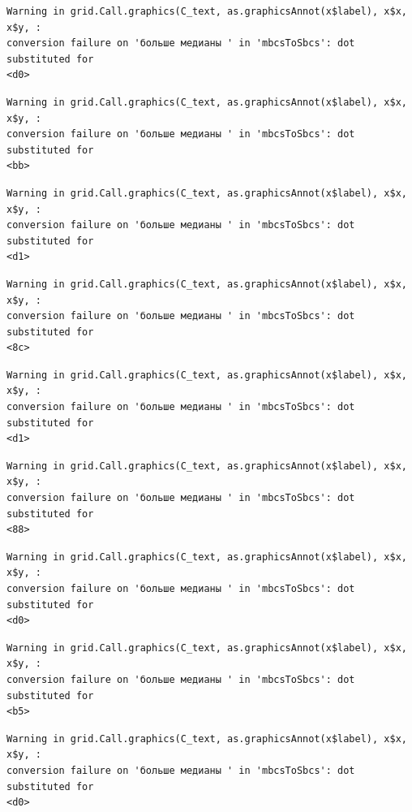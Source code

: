 \documentclass[
  letterpaper,
  DIV=11,
  numbers=noendperiod]{scrreprt}
\theoremstyle{definition}
\theoremstyle{remark}
\begin{document}
\begin{verbatim}
Warning in grid.Call.graphics(C_text, as.graphicsAnnot(x$label), x$x, x$y, :
conversion failure on 'больше медианы ' in 'mbcsToSbcs': dot substituted for
<d0>
\end{verbatim}

\begin{verbatim}
Warning in grid.Call.graphics(C_text, as.graphicsAnnot(x$label), x$x, x$y, :
conversion failure on 'больше медианы ' in 'mbcsToSbcs': dot substituted for
<bb>
\end{verbatim}

\begin{verbatim}
Warning in grid.Call.graphics(C_text, as.graphicsAnnot(x$label), x$x, x$y, :
conversion failure on 'больше медианы ' in 'mbcsToSbcs': dot substituted for
<d1>
\end{verbatim}

\begin{verbatim}
Warning in grid.Call.graphics(C_text, as.graphicsAnnot(x$label), x$x, x$y, :
conversion failure on 'больше медианы ' in 'mbcsToSbcs': dot substituted for
<8c>
\end{verbatim}

\begin{verbatim}
Warning in grid.Call.graphics(C_text, as.graphicsAnnot(x$label), x$x, x$y, :
conversion failure on 'больше медианы ' in 'mbcsToSbcs': dot substituted for
<d1>
\end{verbatim}

\begin{verbatim}
Warning in grid.Call.graphics(C_text, as.graphicsAnnot(x$label), x$x, x$y, :
conversion failure on 'больше медианы ' in 'mbcsToSbcs': dot substituted for
<88>
\end{verbatim}

\begin{verbatim}
Warning in grid.Call.graphics(C_text, as.graphicsAnnot(x$label), x$x, x$y, :
conversion failure on 'больше медианы ' in 'mbcsToSbcs': dot substituted for
<d0>
\end{verbatim}

\begin{verbatim}
Warning in grid.Call.graphics(C_text, as.graphicsAnnot(x$label), x$x, x$y, :
conversion failure on 'больше медианы ' in 'mbcsToSbcs': dot substituted for
<b5>
\end{verbatim}

\begin{verbatim}
Warning in grid.Call.graphics(C_text, as.graphicsAnnot(x$label), x$x, x$y, :
conversion failure on 'больше медианы ' in 'mbcsToSbcs': dot substituted for
<d0>
\end{verbatim}
\end{document}
